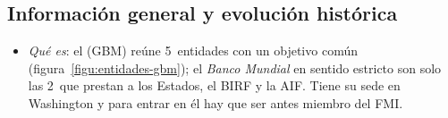 \documentclass[11pt]{article}
\begin{document}
\subsection{Información general y evolución histórica}\label{sec:gbm-historia}

\begin{itemize}
\item \emph{Qué es}: el  (GBM) reúne 5~entidades con un objetivo común (figura~\ref{figu:entidades-gbm}); el \emph{Banco Mundial} en sentido estricto son solo las 2~que prestan a los Estados, el BIRF y la AIF. Tiene su sede en Washington y para entrar en él hay que ser antes miembro del FMI.
\end{itemize}

\begin{infografia}[H]
\centering
\caption{Las 5~entidades del Grupo del Banco Mundial: qué hacen, para quién y cómo se financian}\label{figu:entidades-gbm}
\end{infografia}
\end{document}
